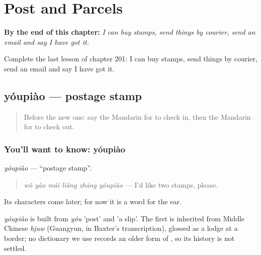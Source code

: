 
\chapter{Post and Parcels}
\label{ch:zh-post-and-parcels}

\begin{chapteropening}
\textbf{By the end of this chapter:} \emph{I can buy stamps, send things by courier, send an email and say I have got it.}

Complete the last lesson of chapter 201: I can buy stamps, send things by courier, send an email and say I have got it.
\end{chapteropening}

\section[yóupiào]{yóupiào — postage stamp}

\label{lesson:ZH-C201-youpiao}



\begin{quote}
Before the new one: say the Mandarin for to check in, then the Mandarin for to check out.
\end{quote}

\subsection*{You'll want to know: yóupiào}
\emph{yóupiào} — \textquotedblleft{}postage stamp\textquotedblright{}.

\begin{quote}
\emph{wǒ yào mǎi liǎng zhāng yóupiào} — I'd like two stamps, please.
\end{quote}

Its characters come later; for now it is a word for the ear.

\begin{cousinweb}
\emph{yóupiào} is built from \emph{yóu} 'post' and  'a slip'. The first is inherited from Middle Chinese \emph{hjuw} (Guangyun, in Baxter's transcription), glossed as a lodge at a border; no dictionary we use records an older form of , so its history is not settled.
\end{cousinweb}

